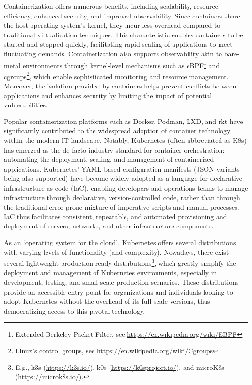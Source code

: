 \documentclass{easychair}
\begin{document}
Containerization offers numerous benefits, including scalability, resource efficiency, enhanced security, and improved observability. Since containers share the host operating system's kernel, they incur less overhead compared to traditional virtualization techniques. This characteristic enables containers to be started and stopped quickly, facilitating rapid scaling of applications to meet fluctuating demands. Containerization also supports observability akin to bare-metal environments through kernel-level mechanisms such as eBPF\footnote{Extended Berkeley Packet Filter, see \url{https://en.wikipedia.org/wiki/EBPF}}
and cgroups\footnote{Linux's control groups, see \url{https://en.wikipedia.org/wiki/Cgroups}}, which enable sophisticated monitoring and resource management. Moreover, the isolation provided by containers helps prevent conflicts between applications and enhances security by limiting the impact of potential vulnerabilities.


Popular containerization platforms such as Docker, Podman, LXD, and rkt have significantly contributed to the widespread adoption of container technology within the modern IT landscape. Notably, Kubernetes (often abbreviated as K8s) has emerged as the de-facto industry standard for container orchestration: automating the deployment, scaling, and management of containerized applications. Kubernetes' YAML-based configuration manifests (JSON-variants being also supported) have become widely adopted as a language for  declarative infrastructure-as-code (IaC), enabling developers and operations teams to manage infrastructure through declarative, version-controlled code, rather than through the traditional error-prone mixture of imperative scripts and manual processes. IaC thus facilitates consistent, repeatable, and automated provisioning and deployment of servers, networks, and other infrastructure components.

As an `operating system for the cloud', Kubernetes offers several distributions with varying levels of functionality (and complexity). Nowadays, there exist several lightweight production-ready distributions\footnote{E.g., k3s (\url{https://k3s.io/}), k0s (\url{https://k0sproject.io/}), and microK8s (\url{https://microk8s.io/}).}, which greatly simplify the deployment and management of Kubernetes environments, especially in development, testing, and small-scale production scenarios. These distributions provide an accessible entry point for organizations and individuals looking to adopt Kubernetes without the overhead of its full-scale versions, thus democratizing access to this pivotal technology.
\end{document}
